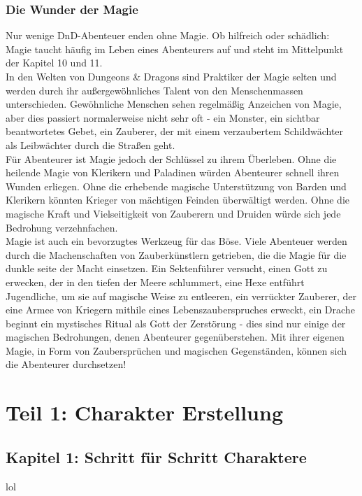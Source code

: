 \subsection{Die Wunder der Magie}
Nur wenige DnD-Abenteuer enden ohne Magie. Ob hilfreich oder schädlich: Magie taucht häufig im Leben eines Abenteurers auf und steht im Mittelpunkt der Kapitel 10 und 11.\\
In den Welten von Dungeons & Dragons sind Praktiker der Magie selten und werden durch ihr außergewöhnliches Talent von den Menschenmassen unterschieden. Gewöhnliche Menschen sehen regelmäßig Anzeichen von Magie, aber dies passiert normalerweise nicht sehr oft - ein Monster, ein sichtbar beantwortetes Gebet, ein Zauberer, der mit einem verzaubertem Schildwächter als Leibwächter durch die Straßen geht.\\
Für Abenteurer ist Magie jedoch der Schlüssel zu ihrem Überleben. Ohne die heilende Magie von Klerikern und Paladinen würden Abenteurer schnell ihren Wunden erliegen. Ohne die erhebende magische Unterstützung von Barden und Klerikern könnten Krieger von mächtigen Feinden überwältigt werden. Ohne die magische Kraft und Vielseitigkeit von Zauberern und Druiden würde sich jede Bedrohung verzehnfachen.\\
Magie ist auch ein bevorzugtes Werkzeug für das Böse. Viele Abenteuer werden durch die Machenschaften von Zauberkünstlern getrieben, die die Magie für die dunkle seite der Macht einsetzen. Ein Sektenführer versucht, einen Gott zu erwecken, der in den tiefen der Meere schlummert, eine Hexe entführt Jugendliche, um sie auf magische Weise zu entleeren, ein verrückter Zauberer, der eine Armee von Kriegern mithile eines Lebenszauberspruches erweckt, ein Drache beginnt ein mystisches Ritual als Gott der Zerstörung - dies sind nur einige der magischen Bedrohungen, denen Abenteurer gegenüberstehen. Mit ihrer eigenen Magie, in Form von Zaubersprüchen und magischen Gegenständen, können sich die Abenteurer durchsetzen!

\chapter{Teil 1: Charakter Erstellung}

\section{Kapitel 1: Schritt für Schritt Charaktere}
lol
